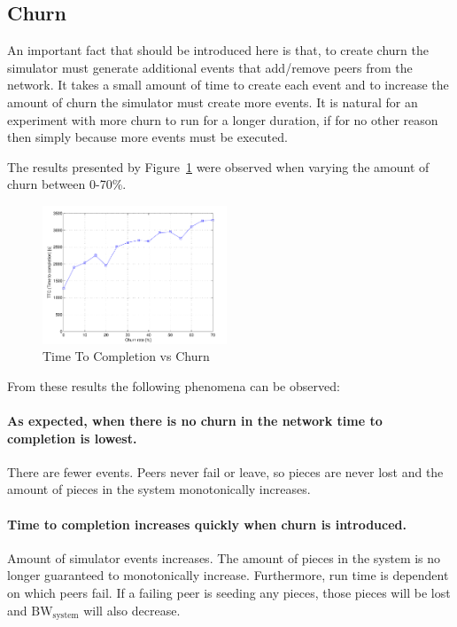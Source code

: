 \documentclass[a4paper,12pt,twocolumn]{article}
\newcommand{\fref}[1]{Figure~\ref{#1}}
\begin{document}
\subsection{Churn}
\label{subsec:churn_results}

An important fact that should be introduced here is that, to create churn the simulator must generate additional events that add/remove peers from the network. It takes a small amount of time to create each event and to increase the amount of churn the simulator must create more events. It is natural for an experiment with more churn to run for a longer duration, if for no other reason then simply because more events must be executed.

The results presented by \fref{fig:churn} were observed when varying the amount of churn between 0-70\%.

\begin{figure}[!htbp]
  \centering
  \includegraphics[width=0.49\textwidth]{figs/Experiment5_TTC}
  \caption{Time To Completion vs Churn}
  \label{fig:churn}
\end{figure}

From these results the following phenomena can be observed:

\paragraph{As expected, when there is no churn in the network time to completion is lowest.}
There are fewer events. Peers never fail or leave, so pieces are never lost and the amount of pieces in the system monotonically increases.

\paragraph{Time to completion increases quickly when churn is introduced.}
Amount of simulator events increases. The amount of pieces in the system is no longer guaranteed to monotonically increase. Furthermore, run time is dependent on which peers fail. If a failing peer is seeding any pieces, those pieces will be lost and $\text{BW}_{\text{system}}$ will also decrease.
\end{document}
